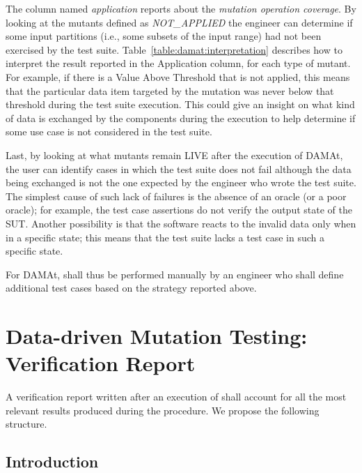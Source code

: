 The column named \emph{application} reports about the \emph{mutation operation coverage}. By looking at the mutants defined as \emph{NOT\_APPLIED} the engineer can determine if some input partitions (i.e., some subsets of the input range) had not been exercised by the test suite. Table~\ref{table:damat:interpretation} describes how to interpret the result reported in the Application column, for each type of mutant.
For example, if there is a Value Above Threshold that is not applied, this means that the particular data item targeted by the mutation was never below that threshold during the test suite execution.
This could give an insight on what kind of data is exchanged by the components during the execution to help determine if some use case is not considered in the test suite.


Last, by looking at what mutants remain LIVE after the execution of DAMAt, the user can identify cases in which the test suite does not fail although the data being exchanged is not the one expected by the engineer who wrote the test suite.
The simplest cause of such lack of failures is the absence of an oracle (or a poor oracle); for example, the test case assertions do not verify the output state of the SUT.
Another possibility is that the software reacts to the invalid data only when in a specific state; this means that the test suite lacks a test case in such a specific state.

For DAMAt,  shall thus be performed manually by an engineer who shall define additional test cases based on the strategy reported above.




\STARTCHANGEDFINAL
\section{Data-driven Mutation Testing: Verification Report}
A verification report written after an execution of \DAMA shall account for all the most relevant results produced during the procedure. We propose the following structure.

  \subsection{Introduction}


